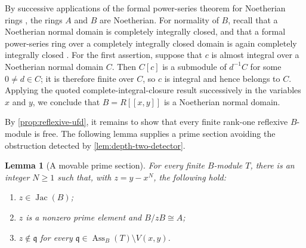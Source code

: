 \documentclass[reqno]{amsart}
\theoremstyle{plain}
\newtheorem{lemma}[theorem]{Lemma}
\theoremstyle{definition}
\newcommand{\Ass}{\operatorname{Ass}}
\newcommand{\Jac}{\operatorname{Jac}}
\begin{document}
By successive applications of the formal power-series theorem for Noetherian
rings \cite[Corollary~10.27]{AtiyahMacdonald}, the rings $A$ and $B$ are
Noetherian.  For normality of $B$, recall that a
Noetherian normal domain is completely integrally closed, and that a formal
power-series ring over a completely integrally closed domain is again
completely integrally closed
\cite[Chapter~V, \S1, no.~1, Corollary to Proposition~1, p.~304; no.~4,
pp.~312--313, especially Proposition~14]{BourbakiCA}.  For the first
assertion, suppose that $c$ is almost integral over a Noetherian normal
domain $C$.  Then $C[c]$ is a submodule of $d^{-1}C$ for
some $0\neq d\in C$; it is therefore finite over $C$, so $c$ is integral
and hence belongs to $C$.  Applying the quoted complete-integral-closure
result successively in the variables $x$ and $y$, we conclude that
$B=R[[x,y]]$ is a Noetherian normal domain.

By \cref{prop:reflexive-ufd}, it remains to show that every finite
rank-one reflexive $B$-module is free.  The following lemma supplies a prime
section avoiding the obstruction detected by
\cref{lem:depth-two-detector}.

\begin{lemma}[A movable prime section]
\label{lem:movable-section}
For every finite $B$-module $T$, there is an integer $N\geq1$ such that,
with $z=y-x^N$, the following hold:
\begin{enumerate}[label=\textup{(\roman*)}]
  \item $z\in\Jac(B)$;
  \item $z$ is a nonzero prime element and $B/zB\cong A$;
  \item $z\notin\mathfrak q$ for every
        $\mathfrak q\in\Ass_B(T)\setminus V(x,y)$.
\end{enumerate}
\end{lemma}
\end{document}
